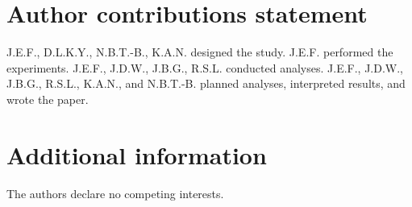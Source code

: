 \documentclass[11pt,letterpaper]{article}
\begin{document}
\section*{Author contributions statement}

J.E.F., D.L.K.Y., N.B.T.-B., K.A.N. designed the study. J.E.F. performed the experiments. J.E.F., J.D.W., J.B.G., R.S.L. conducted analyses. J.E.F., J.D.W., J.B.G., R.S.L., K.A.N., and N.B.T.-B. planned analyses, interpreted results, and wrote the paper.

\section*{Additional information}

The authors declare no competing interests.



\setlength{\bibleftmargin}{.125in}
\setlength{\bibindent}{-\bibleftmargin}

\newpage

\end{document}
